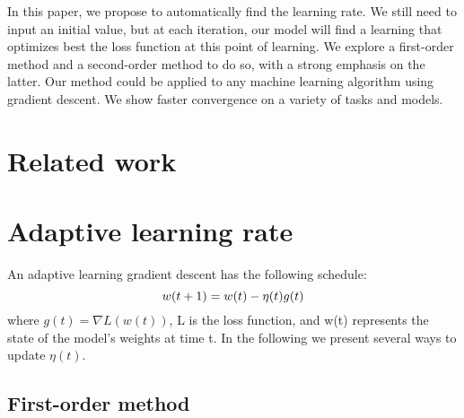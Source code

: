 \documentclass{article}
\begin{document}
  In this paper, we propose to automatically find the learning rate. We still need to input an initial value, but at each iteration, our model will find a learning that optimizes best the loss function at this point of learning. We explore a first-order method and a second-order method to do so, with a strong emphasis on the latter. Our method could be applied to any machine learning algorithm using gradient descent. We show faster convergence on a variety of tasks and models. \\ 
  
  \section{Related work}
  
  \section{Adaptive learning rate}
  
  An adaptive learning gradient descent has the following schedule:\\
  \begin{equation}
  w(t+1) = w(t) -\eta(t)g(t)\\
  \end{equation}
  where $g(t) = \nabla L(w(t))$, L is the loss function, and w(t) represents the state of the model's weights at time t. In the following we present several ways to update $\eta(t)$.
  
  \subsection{First-order method}
  
\end{document}
